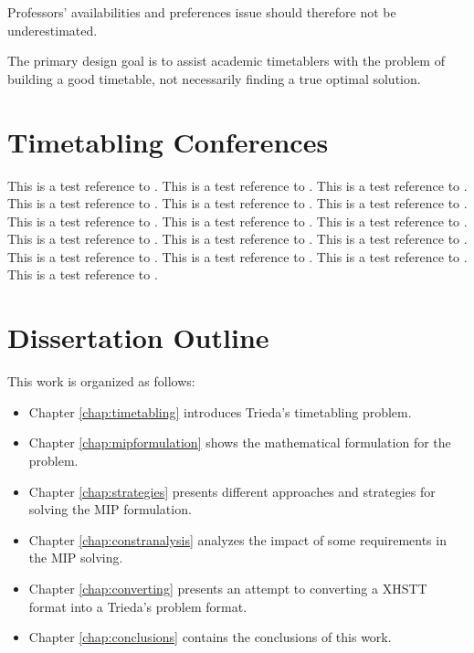 Professors' availabilities and preferences issue should therefore not be underestimated.


The primary design goal is to assist academic timetablers with the problem of building a good timetable, not necessarily finding a true optimal solution.


\section{Timetabling Conferences}





This is a test reference to \cite{Carter2001}.    %
This is a test reference to \cite{Murray2007}.    %
This is a test reference to \cite{Unitime}.       %
This is a test reference to \cite{DSS}.           %
This is a test reference to \cite{Guenalay2006}.  %
This is a test reference to \cite{Schaerf99}.  		%
This is a test reference to \cite{Michael2002}.   %
This is a test reference to \cite{SchoolOverview2010}.   %
This is a test reference to \cite{Birbas2009}.    %
This is a test reference to \cite{Mimosasoftware}.
This is a test reference to \cite{Patat}.
This is a test reference to \cite{Hstt}.				  %
This is a test reference to \cite{ITC2007}.				%
This is a test reference to \cite{Ectt}.					%
This is a test reference to \cite{Udine}.
This is a test reference to \cite{Watt}.					%





\section{Dissertation Outline}
This work is organized as follows: 
\begin{itemize}
	\item Chapter \ref{chap:timetabling} introduces Trieda's timetabling problem.
	\item Chapter \ref{chap:mipformulation} shows the mathematical formulation for the problem.
	\item Chapter \ref{chap:strategies} presents different approaches and strategies for solving the MIP formulation.
	\item Chapter \ref{chap:constranalysis} analyzes the impact of some requirements in the MIP solving.
	\item Chapter \ref{chap:converting} presents an attempt to converting a XHSTT format into a Trieda's problem format.
	\item Chapter \ref{chap:conclusions} contains the conclusions of this work.
\end{itemize}